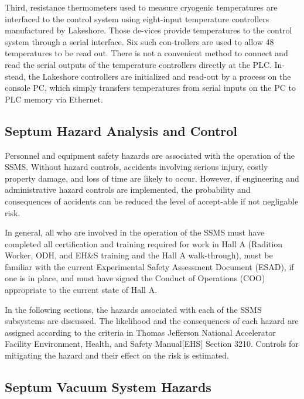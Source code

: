 {\begin{list}{--}{\setlength{\itemsep}{0.cm}}
\item Third, resistance thermometers used to measure cryogenic temperatures are interfaced to the control 
system using eight-input temperature controllers manufactured by Lakeshore.  Those de-vices provide 
temperatures to the control system through a serial interface.  Six such con-trollers are used to allow 
48 temperatures to be read out.  There is not a convenient method to connect and read the serial outputs 
of the temperature controllers directly at the PLC.  In-stead, the Lakeshore controllers are initialized 
and read-out by a process on the console PC, which simply transfers temperatures from serial inputs on 
the PC to PLC memory via Ethernet.
\end{list}
}

\begin{safetyen}{10}{15}
\subsection {\bf Septum Hazard Analysis and Control}
\end{safetyen}


Personnel and equipment safety hazards are associated with the operation of the SSMS.  
Without hazard controls, accidents involving serious injury, costly property damage, and loss of 
time are likely to occur.  However, if engineering and administrative hazard controls are implemented, 
the probability and consequences of accidents can be reduced the level of accept-able if not negligable risk.

In general, all who are involved in the operation of the SSMS must have completed all certification 
and training required for work in Hall A (Radition Worker, ODH, and EH\&S training and the Hall A 
walk-through), must be familiar with the current Experimental Safety Assessment Document (ESAD), 
if one is in place, and must have signed the Conduct of Operations (COO) appropriate to the current 
state of Hall A.  

In the following sections, the hazards associated with each of the SSMS subsystems are discussed.  The 
likelihood and the consequences of each hazard are assigned according to the criteria in Thomas Jefferson 
National Accelerator Facility Environment, Health, and Safety Manual[EHS] Section 3210.  
Controls for mitigating the hazard and their effect on the risk is estimated.


\begin{safetyen}{10}{15}
\subsection {\bf Septum Vacuum System Hazards}
\end{safetyen}



